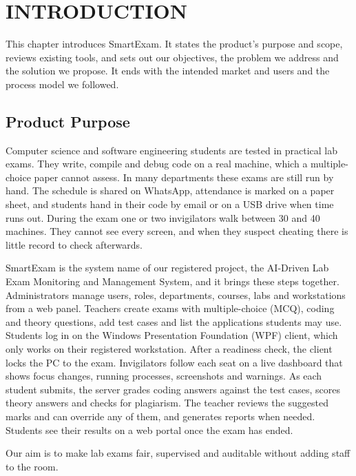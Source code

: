 \chapter{INTRODUCTION}
\label{chap:introduction}

This chapter introduces SmartExam. It states the product's purpose and scope, reviews existing tools, and sets out our objectives, the problem we address and the solution we propose. It ends with the intended market and users and the process model we followed.

\section{Product Purpose}
\label{sec:productpurpose}

Computer science and software engineering students are tested in practical lab exams. They write, compile and debug code on a real machine, which a multiple-choice paper cannot assess. In many departments these exams are still run by hand. The schedule is shared on WhatsApp, attendance is marked on a paper sheet, and students hand in their code by email or on a USB drive when time runs out. During the exam one or two invigilators walk between 30 and 40 machines. They cannot see every screen, and when they suspect cheating there is little record to check afterwards.

SmartExam is the system name of our registered project, the AI-Driven Lab Exam Monitoring and Management System, and it brings these steps together. Administrators manage users, roles, departments, courses, labs and workstations from a web panel. Teachers create exams with multiple-choice (MCQ), coding and theory questions, add test cases and list the applications students may use. Students log in on the Windows Presentation Foundation (WPF) client, which only works on their registered workstation. After a readiness check, the client locks the PC to the exam. Invigilators follow each seat on a live dashboard that shows focus changes, running processes, screenshots and warnings. As each student submits, the server grades coding answers against the test cases, scores theory answers and checks for plagiarism. The teacher reviews the suggested marks and can override any of them, and generates reports when needed. Students see their results on a web portal once the exam has ended.

Our aim is to make lab exams fair, supervised and auditable without adding staff to the room.

